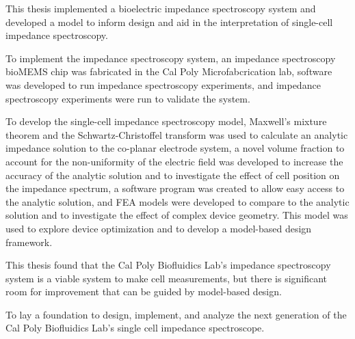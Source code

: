 
\par This thesis implemented a bioelectric impedance spectroscopy system and developed a model to inform design and aid in the interpretation of single-cell impedance spectroscopy.
\par To implement the impedance spectroscopy system, an impedance spectroscopy bioMEMS chip was fabricated in the Cal Poly Microfabcrication lab, software was developed to run impedance spectroscopy experiments, and impedance spectroscopy experiments were run to validate the system. 
\par To develop the single-cell impedance spectroscopy model, Maxwell's mixture theorem and the Schwartz-Christoffel transform was used to calculate an analytic impedance solution to the co-planar electrode system, a novel volume fraction to account for the non-uniformity of the electric field was developed to increase the accuracy of the analytic solution and to investigate the effect of cell position on the impedance spectrum, a software program was created to allow easy access to the analytic solution, and FEA models were developed to compare to the analytic solution and to investigate the effect of complex device geometry. This model was used to explore device optimization and to develop a model-based design framework.


\par This thesis found that the Cal Poly Biofluidics Lab's impedance spectroscopy system is a viable system to make cell measurements, but there is significant room for improvement that can be guided by model-based design. 

\par To lay a foundation to design, implement, and analyze the next generation of the Cal Poly Biofluidics Lab's single cell impedance spectroscope. 